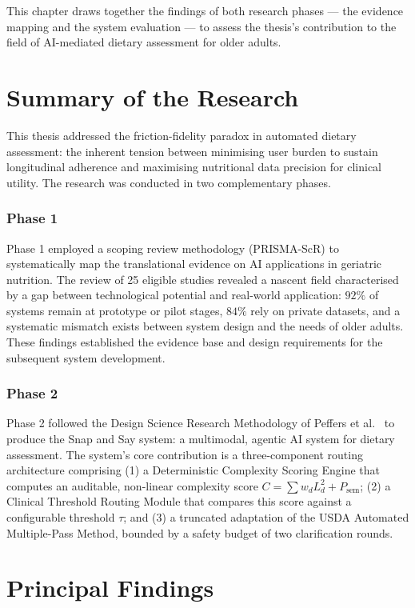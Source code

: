 This chapter draws together the findings of both research phases --- the evidence mapping and the system evaluation --- to assess the thesis's contribution to the field of AI-mediated dietary assessment for older adults.

\section{Summary of the Research}

This thesis addressed the friction-fidelity paradox in automated dietary assessment: the inherent tension between minimising user burden to sustain longitudinal adherence and maximising nutritional data precision for clinical utility. The research was conducted in two complementary phases.

\subsubsection{Phase 1}
Phase 1 employed a scoping review methodology (PRISMA-ScR) to systematically map the translational evidence on AI applications in geriatric nutrition. The review of 25 eligible studies revealed a nascent field characterised by a gap between technological potential and real-world application: $92\%$ of systems remain at prototype or pilot stages, $84\%$ rely on private datasets, and a systematic mismatch exists between system design and the needs of older adults. These findings established the evidence base and design requirements for the subsequent system development.

\subsubsection{Phase 2}
Phase 2 followed the Design Science Research Methodology of Peffers et al.\ \citep{peffersDesignScienceResearch2007} to produce the Snap and Say system: a multimodal, agentic AI system for dietary assessment. The system's core contribution is a three-component routing architecture comprising (1) a Deterministic Complexity Scoring Engine that computes an auditable, non-linear complexity score $C = \sum w_d L_d^2 + P_{\text{sem}}$; (2) a Clinical Threshold Routing Module that compares this score against a configurable threshold $\tau$; and (3) a truncated adaptation of the USDA Automated Multiple-Pass Method, bounded by a safety budget of two clarification rounds.

\section{Principal Findings}

